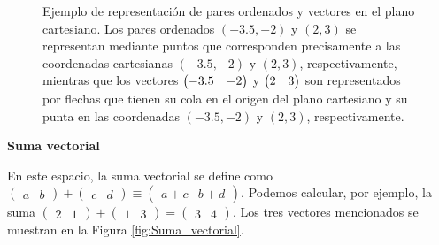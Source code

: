 \documentclass[12pt,dvipsnames]{article}
\begin{document}
\begin{figure}[h!]
    \centering
    \caption{Ejemplo de representación de pares ordenados y vectores en el plano cartesiano. Los pares ordenados $(-3.5,-2)$ y $(2,3)$ se representan mediante puntos que corresponden precisamente a las coordenadas cartesianas $(-3.5,-2)$ y $(2,3)$, respectivamente, mientras que los vectores $\protect\begin{pmatrix} -3.5 & -2 \protect\end{pmatrix}$ y $\protect\begin{pmatrix} 2 & 3 \protect\end{pmatrix}$ son representados por flechas que tienen su cola en el origen del plano cartesiano y su punta en las coordenadas $(-3.5,-2)$ y $(2,3)$, respectivamente.} 
    \label{fig:Correspondencias_del_plano_cartesiano}
\end{figure}

\vspace{3mm}
\textbf{Suma vectorial}
\vspace{3mm}

    En este espacio, la suma vectorial se define como $\begin{pmatrix}a&b\end{pmatrix}+\begin{pmatrix}c&d\end{pmatrix}\equiv\begin{pmatrix}a+c&b+d\end{pmatrix}$. Podemos calcular, por ejemplo, la suma $\begin{pmatrix}2&1\end{pmatrix}+\begin{pmatrix}1&3\end{pmatrix}=\begin{pmatrix}3&4\end{pmatrix}$. Los tres vectores mencionados se muestran en la Figura \ref{fig:Suma_vectorial}.
\end{document}

